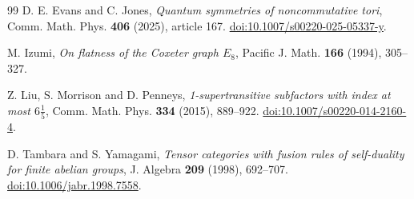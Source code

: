 \begin{thebibliography}{99}
D. E. Evans and C. Jones,
\emph{Quantum symmetries of noncommutative tori},
Comm. Math. Phys. \textbf{406} (2025), article 167.
\href{https://doi.org/10.1007/s00220-025-05337-y}{doi:10.1007/s00220-025-05337-y}.

M. Izumi,
\emph{On flatness of the Coxeter graph $E_8$},
Pacific J. Math. \textbf{166} (1994), 305--327.

Z. Liu, S. Morrison and D. Penneys,
\emph{1-supertransitive subfactors with index at most $6\frac15$},
Comm. Math. Phys. \textbf{334} (2015), 889--922.
\href{https://doi.org/10.1007/s00220-014-2160-4}{doi:10.1007/s00220-014-2160-4}.

D. Tambara and S. Yamagami,
\emph{Tensor categories with fusion rules of self-duality for finite abelian groups},
J. Algebra \textbf{209} (1998), 692--707.
\href{https://doi.org/10.1006/jabr.1998.7558}{doi:10.1006/jabr.1998.7558}.
\end{thebibliography}
